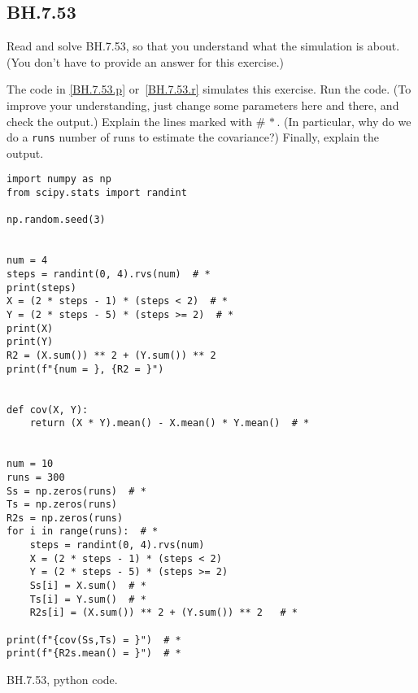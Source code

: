 

\subsection{BH.7.53}
\label{sec:bh.53}

\begin{exercise}
Read and solve BH.7.53, so that you understand what the simulation is about. (You don't have to provide an answer for this exercise.)
\end{exercise}


\begin{exercise}
The code in \cref{BH.7.53.p} or~\cref{BH.7.53.r} simulates this exercise.
Run the code. (To improve your understanding, just change some parameters here and there, and check the output.) Explain the lines marked with $\# \, *$. (In particular, why do we do a \verb|runs| number of runs to estimate the covariance?) Finally, explain the output.
\end{exercise}

\begin{listing}[!ht]
\begin{verbatim}
import numpy as np
from scipy.stats import randint

np.random.seed(3)


num = 4
steps = randint(0, 4).rvs(num)  # *
print(steps)
X = (2 * steps - 1) * (steps < 2)  # *
Y = (2 * steps - 5) * (steps >= 2)  # *
print(X)
print(Y)
R2 = (X.sum()) ** 2 + (Y.sum()) ** 2
print(f"{num = }, {R2 = }")


def cov(X, Y):
    return (X * Y).mean() - X.mean() * Y.mean()  # *


num = 10
runs = 300
Ss = np.zeros(runs)  # *
Ts = np.zeros(runs)
R2s = np.zeros(runs)
for i in range(runs):  # *
    steps = randint(0, 4).rvs(num)
    X = (2 * steps - 1) * (steps < 2)
    Y = (2 * steps - 5) * (steps >= 2)
    Ss[i] = X.sum()  # *
    Ts[i] = Y.sum()  # *
    R2s[i] = (X.sum()) ** 2 + (Y.sum()) ** 2   # *

print(f"{cov(Ss,Ts) = }")  # *
print(f"{R2s.mean() = }")  # *
\end{verbatim}
\caption{BH.7.53, python code.}
\label{BH.7.53.p}


\end{listing}

